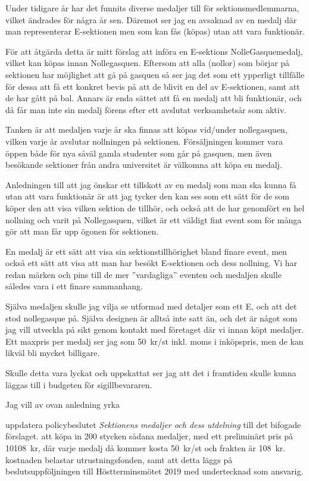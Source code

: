 \documentclass[../_main/handlingar.tex]{subfiles}
\begin{document}

Under tidigare år har det funnits diverse medaljer till för sektionsmedlemmarna,
vilket ändrades för några år sen. Däremot ser jag en avsaknad av en medalj där man
representerar E-sektionen men som kan fås (köpas) utan att vara funktionär.

För att åtgärda detta är mitt förslag att införa en E-sektions NolleGasquemedalj,
vilket kan köpas innan Nollegasquen. Eftersom att alla (nollor) som börjar på
sektionen har möjlighet att gå på gasquen så ser jag det som ett ypperligt tillfälle för
dessa att få ett konkret bevis på att de blivit en del av E-sektionen, samt att de har
gått på bal. Annars är enda sättet att få en medalj att bli funktionär, och då får man
inte sin medalj förens efter ett avslutat verksamhetsår som aktiv.

Tanken är att medaljen varje år ska finnas att köpas vid/under nollegasquen, vilken
varje år avslutar nollningen på sektionen. Försäljningen kommer vara öppen både för
nya såväl gamla studenter som går på gasquen, men även besökande sektioner från
andra universitet är välkomna att köpa en medalj.

Anledningen till att jag önskar ett tillskott av en medalj som man ska kunna få utan
att vara funktionär är att jag tycker den kan ses som ett sätt för de som köper den att
visa vilken sektion de tillhör, och också att de har genomfört en hel nollning och varit
på Nollegasquen, vilket är ett väldigt fint event som för många gör att man får upp
ögonen för sektionen.

En medalj är ett sätt att visa sin sektionstillhörighet bland finare event, men också ett
sätt att visa att man har besökt E-sektionen och dess nollning. Vi har redan märken
och pins till de mer ”vardagliga” eventen och medaljen skulle således vara i ett finare
sammanhang.

Själva medaljen skulle jag vilja se utformad med detaljer som ett E, och att det stod
nollegasque på. Själva designen är alltså inte satt än, och det är något som jag vill
utveckla på sikt genom kontakt med företaget där vi innan köpt medaljer. Ett maxpris
per medalj ser jag som \SI{50}{kr}/st inkl. moms i inköpspris, men de kan likväl bli mycket
billigare.

Skulle detta vara lyckat och uppskattat ser jag att det i framtiden skulle kunna läggas
till i budgeten för sigillbevararen.

Jag vill av ovan anledning yrka 
\begin{attsatser}
    \att uppdatera policybeslutet \emph{Sektionens medaljer och dess utdelning} till det bifogade förslaget.
    \att att köpa in 200 stycken sådana medaljer, med ett preliminärt pris på \SI{10108}{kr}, där varje medalj då kommer kosta \SI{50}{kr}/st och frakten är \SI{108}{kr}.
    \att kostnaden belastar utrustningsfonden, samt    
    \att att detta läggs på beslutsuppföljningen till Höstterminsmötet 2019 med undertecknad som ansvarig.
\end{attsatser}
\end{document}
